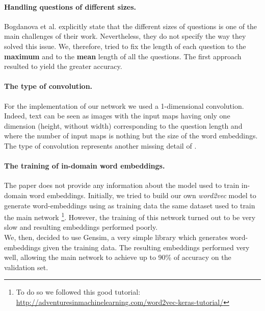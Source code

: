 \documentclass[10pt,twocolumn,letterpaper]{article}
\begin{document}
    \paragraph{Handling questions of different sizes.}
    Bogdanova et al. explicitly state that the different sizes of questions is one of the main challenges of their work. Nevertheless, they do not specify the way they solved this issue. We, therefore, tried to fix the length of each question to the \textbf{maximum} and to the \textbf{mean} length of all the questions. The first approach resulted to yield the greater accuracy.
    \paragraph{The type of convolution.}
    For the implementation of our network we used a 1-dimensional convolution. Indeed, text can be seen as images with the input maps having only one dimension (height, without width) corresponding to the question length and where the number of input maps is nothing but the size of the word embeddings. The type of convolution represents another missing detail of \cite{bogdanova2015detecting}.    
    \paragraph{The training of in-domain word embeddings.}
    The paper does not provide any information about the model used to train in-domain word embeddings. Initially, we tried to build our own \emph{word2vec} model \cite{mikolov2013distributed} to generate word-embeddings using as training data the same dataset used to train the main network \footnote{To do so we followed this good tutorial: \url{http://adventuresinmachinelearning.com/word2vec-keras-tutorial/}}. However, the training of this network turned out to be very slow and resulting embeddings performed poorly. \\
    We, then, decided to use Gensim, a very simple library which generates word-embeddings given the training data. The resulting embeddings performed very well, allowing the main network to achieve up to 90\% of accuracy on the validation set.

\end{document}
